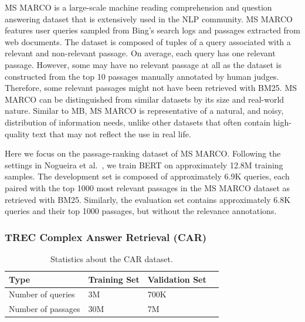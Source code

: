 MS MARCO is a large-scale machine reading comprehension and question answering dataset that is extensively used in the NLP community.
MS MARCO~\cite{nguyen2016msmarco} features user queries sampled from Bing’s search logs and passages extracted from web documents.
The dataset is composed of tuples of a query associated with a relevant and non-relevant passage.
On average, each query has one relevant passage.
However, some may have no relevant passage at all as the dataset is constructed from the top 10 passages manually annotated by human judges.
Therefore, some relevant passages might not have been retrieved with BM25.
MS MARCO can be distinguished from similar datasets by its size and real-world nature.
Similar to MB, MS MARCO is representative of a natural, and noisy, distribution of information needs, unlike other datasets that often contain high-quality text that may not reflect the use in real life.

Here we focus on the passage-ranking dataset of MS MARCO.
Following the settings in Nogueira et al.~\cite{nogueira2019passage}, we train BERT on approximately 12.8M training samples.
The development set is composed of approximately 6.9K queries, each paired with the top 1000 most relevant passages in the MS MARCO dataset as retrieved with BM25.
Similarly, the evaluation set contains approximately 6.8K queries and their top 1000 passages, but without the relevance annotations.

\subsubsection{TREC Complex Answer Retrieval (CAR)}

\begin{table}[t!]
\vspace{0.2cm}
\centering
\begin{tabular}{llll}
\toprule
\textbf{Type} \mbox{\hspace{0.5cm}} & \textbf{Training Set} \mbox{\hspace{1.0cm}} & \textbf{Validation Set} \mbox{\hspace{1.0cm}} \\
\toprule
Number of queries & 3M & 700K \\
Number of passages & 30M & 7M \\
\bottomrule
\end{tabular}
\vspace{0.2cm}
\caption{Statistics about the CAR dataset.}
\label{tab:car-stats}
\end{table}

